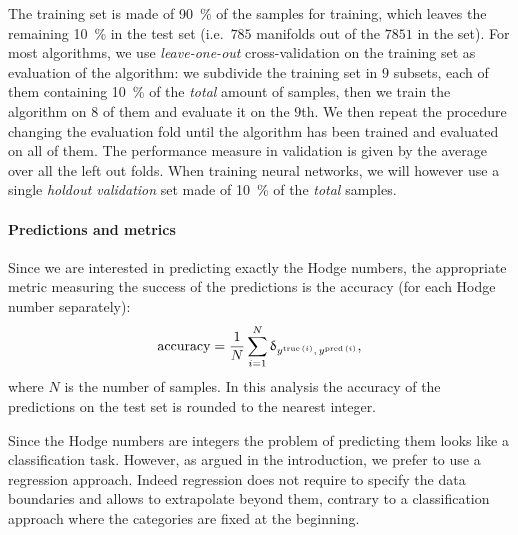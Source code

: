 The training set is made of \SI{90}{\percent} of the samples for training, which leaves the remaining \SI{10}{\percent} in the test set (i.e.\ $785$ manifolds out of the $7851$ in the set).\footnotemark{}
For most algorithms, we use \emph{leave-one-out} cross-validation on the training set as evaluation of the algorithm: we subdivide the training set in $9$ subsets, each of them containing \SI{10}{\percent} of the \emph{total} amount of samples, then we train the algorithm on $8$ of them and evaluate it on the $9$th.
We then repeat the procedure changing the evaluation fold until the algorithm has been trained and evaluated on all of them.
The performance measure in validation is given by the average over all the left out folds.
When training neural networks, we will however use a single \emph{holdout validation} set made of \SI{10}{\percent} of the \emph{total} samples.


\paragraph{Predictions and metrics}

Since we are interested in predicting exactly the Hodge numbers, the appropriate metric measuring the success of the predictions is the accuracy (for each Hodge number separately):
\begin{equation}
  \text{accuracy}
  =
  \frac{1}{N} \sum\limits_{i = 1}^{N}
  \updelta_{y^{\text{true}\, (i)},\, y^{\text{pred}\, (i)}},
\end{equation}
where $N$ is the number of samples.
In this analysis the accuracy of the predictions on the test set is rounded to the nearest integer.

Since the Hodge numbers are integers the problem of predicting them looks like a classification task.
However, as argued in the introduction, we prefer to use a regression approach.
Indeed regression does not require to specify the data boundaries and allows to extrapolate beyond them, contrary to a classification approach where the categories are fixed at the beginning.\footnotemark{}

